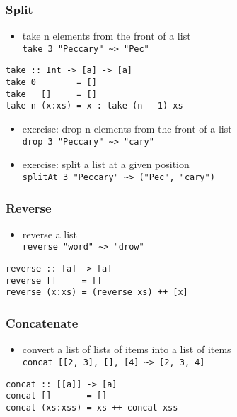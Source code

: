 \documentclass[dvipsnames]{beamer}
\theoremstyle{plain}
\begin{document}
\begin{frame}[fragile]
  \frametitle{Split}

  \begin{itemize}
    \item take n elements from the front of a list\\
      \lstinline[style=exclamfix]|take 3 "Peccary" ~> "Pec"|
  \end{itemize}

  \begin{exampleblock}{}
    \begin{lstlisting}[deletekeywords={take}]
take :: Int -> [a] -> [a]
take 0 _      = []
take _ []     = []
take n (x:xs) = x : take (n - 1) xs
    \end{lstlisting}
  \end{exampleblock}

  \pause
  \begin{itemize}
    \item exercise: drop n elements from the front of a list\\
      \lstinline[style=exclamfix]|drop 3 "Peccary" ~> "cary"|

    \item exercise: split a list at a given position\\
      \lstinline[style=exclamfix]|splitAt 3 "Peccary" ~> ("Pec", "cary")|
  \end{itemize}
\end{frame}

\begin{frame}[fragile]
  \frametitle{Reverse}

  \begin{itemize}
    \item reverse a list\\
      \lstinline[style=exclamfix]|reverse "word" ~> "drow"|
  \end{itemize}

  \begin{exampleblock}{}
    \begin{lstlisting}[deletekeywords={reverse}]
reverse :: [a] -> [a]
reverse []     = []
reverse (x:xs) = (reverse xs) ++ [x]
    \end{lstlisting}
  \end{exampleblock}
\end{frame}

\begin{frame}[fragile]
  \frametitle{Concatenate}

  \begin{itemize}
    \item convert a list of lists of items into a list of items\\
      \lstinline|concat [[2, 3], [], [4] ~> [2, 3, 4]|
  \end{itemize}

  \begin{exampleblock}{}
    \begin{lstlisting}[deletekeywords={concat}]
concat :: [[a]] -> [a]
concat []       = []
concat (xs:xss) = xs ++ concat xss
    \end{lstlisting}
  \end{exampleblock}
\end{frame}
\end{document}

